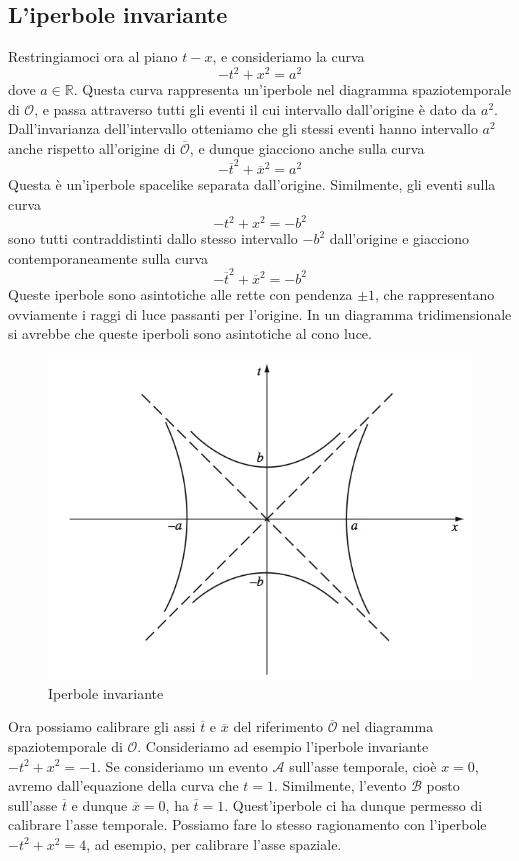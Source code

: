 \documentclass[a4paper,11pt]{book}
\theoremstyle{plain}
\theoremstyle{definition}
\begin{document}
\subsection{L'iperbole invariante}
Restringiamoci ora al piano $t-x$, e consideriamo la curva
\[
-t^2+x^2=a^2
\]
 dove $a\in\mathbb{R}$. Questa curva rappresenta un'iperbole nel diagramma spaziotemporale di $\mathcal{O}$, e passa attraverso tutti gli eventi il cui intervallo dall'origine è dato da $a^2$. Dall'invarianza dell'intervallo otteniamo che gli stessi eventi hanno intervallo $a^2$ anche rispetto all'origine di $\mathcal{\overline{O}}$, e dunque giacciono anche sulla curva
 \[
 -\overline{t}^2+\overline{x}^2=a^2
 \]
 Questa è un'iperbole spacelike separata dall'origine. Similmente, gli eventi sulla curva
 \[
 -t^2+x^2=-b^2
 \]
 sono tutti contraddistinti dallo stesso intervallo $-b^2$ dall'origine e giacciono contemporaneamente sulla curva
 \[
  -\overline{t}^2+\overline{x}^2=-b^2
 \]
 Queste iperbole sono asintotiche alle rette con pendenza $\pm 1$, che rappresentano ovviamente i raggi di luce passanti per l'origine. In un diagramma tridimensionale si avrebbe che queste iperboli sono asintotiche al cono luce. 
\begin{figure}[!h]
\centering
\includegraphics[scale=0.45]{iperbole}
\caption{Iperbole invariante}
\end{figure}
Ora possiamo calibrare gli assi $\overline{t}$ e $\overline{x}$ del riferimento $\mathcal{\overline{O}}$ nel diagramma spaziotemporale di $\mathcal{O}$. Consideriamo ad esempio l'iperbole invariante $-t^2+x^2=-1$. Se consideriamo un evento $\mathcal{A}$ sull'asse temporale, cioè $x=0$, avremo dall'equazione della curva che $t=1$. Similmente, l'evento $\mathcal{B}$ posto sull'asse $\overline{t}$ e dunque $\overline{x}=0$, ha $\overline{t}=1$. Quest'iperbole ci ha dunque permesso di calibrare l'asse temporale. Possiamo fare lo stesso ragionamento con l'iperbole $-t^2+x^2=4$, ad esempio, per calibrare l'asse spaziale. 
\end{document}
